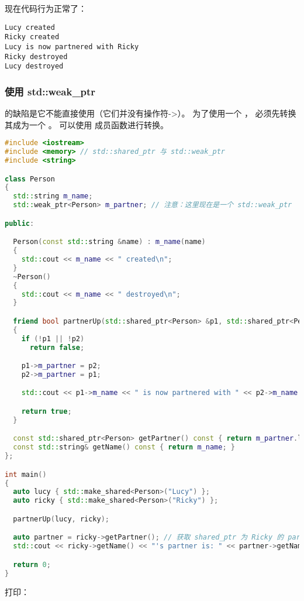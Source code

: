 \documentclass[../../LearnCpp.tex]{subfiles}
\begin{document}
现在代码行为正常了：

\begin{lstlisting}
Lucy created
Ricky created
Lucy is now partnered with Ricky
Ricky destroyed
Lucy destroyed
\end{lstlisting}

\subsubsection*{使用 std::weak\_ptr}

 的缺陷是它不能直接使用（它们并没有操作符->）。
为了使用一个 ，
必须先转换其成为一个 。
可以使用  成员函数进行转换。

\begin{lstlisting}[language=C++]
#include <iostream>
#include <memory> // std::shared_ptr 与 std::weak_ptr
#include <string>

class Person
{
  std::string m_name;
  std::weak_ptr<Person> m_partner; // 注意：这里现在是一个 std::weak_ptr

public:

  Person(const std::string &name) : m_name(name)
  {
    std::cout << m_name << " created\n";
  }
  ~Person()
  {
    std::cout << m_name << " destroyed\n";
  }

  friend bool partnerUp(std::shared_ptr<Person> &p1, std::shared_ptr<Person> &p2)
  {
    if (!p1 || !p2)
      return false;

    p1->m_partner = p2;
    p2->m_partner = p1;

    std::cout << p1->m_name << " is now partnered with " << p2->m_name << '\n';

    return true;
  }

  const std::shared_ptr<Person> getPartner() const { return m_partner.lock(); } // 使用 lock() 转换 weak_ptr 成为 shared_ptr
  const std::string& getName() const { return m_name; }
};

int main()
{
  auto lucy { std::make_shared<Person>("Lucy") };
  auto ricky { std::make_shared<Person>("Ricky") };

  partnerUp(lucy, ricky);

  auto partner = ricky->getPartner(); // 获取 shared_ptr 为 Ricky 的 partner
  std::cout << ricky->getName() << "'s partner is: " << partner->getName() << '\n';

  return 0;
}
\end{lstlisting}

打印：
\end{document}
